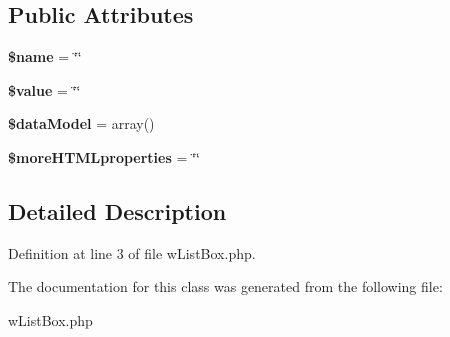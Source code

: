 \subsection*{Public Attributes}
\begin{DoxyCompactItemize}
\item 
\hypertarget{classwListBox_a9abe7f2a9cbb9bc2789c36c6d6e5c9a2}{
{\bfseries \$name} = \char`\"{}\char`\"{}}
\label{classwListBox_a9abe7f2a9cbb9bc2789c36c6d6e5c9a2}

\item 
\hypertarget{classwListBox_a8284fd6edf5490e1a8d78b129c78dfdd}{
{\bfseries \$value} = \char`\"{}\char`\"{}}
\label{classwListBox_a8284fd6edf5490e1a8d78b129c78dfdd}

\item 
\hypertarget{classwListBox_aa6a0ca9020f7542312fb5eb4cd30370c}{
{\bfseries \$dataModel} = array()}
\label{classwListBox_aa6a0ca9020f7542312fb5eb4cd30370c}

\item 
\hypertarget{classwListBox_a4891812ac40824070b7394f794ca3534}{
{\bfseries \$moreHTMLproperties} = \char`\"{}\char`\"{}}
\label{classwListBox_a4891812ac40824070b7394f794ca3534}

\end{DoxyCompactItemize}


\subsection{Detailed Description}


Definition at line 3 of file wListBox.php.



The documentation for this class was generated from the following file:\begin{DoxyCompactItemize}
\item 
wListBox.php\end{DoxyCompactItemize}
